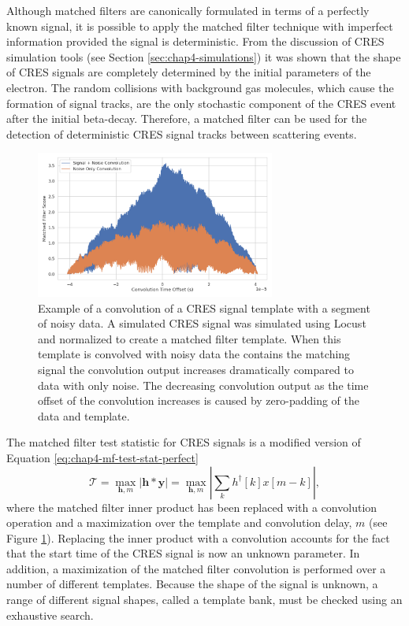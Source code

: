Although matched filters are canonically formulated in terms of a perfectly known signal, it is possible to apply the matched filter technique with imperfect information provided the signal is deterministic. From the discussion of CRES simulation tools (see Section \ref{sec:chap4-simulations}) it was shown that the shape of CRES signals are completely determined by the initial parameters of the electron. The random collisions with background gas molecules, which cause the formation of signal tracks, are the only stochastic component of the CRES event after the initial beta-decay. Therefore, a matched filter can be used for the detection of deterministic CRES signal tracks between scattering events.

\begin{figure}[htbp]
    \centering
    \includegraphics*[width=0.7\textwidth]{figs/Chapter-4/220318_example_convolution.png}
    \caption{Example of a convolution of a CRES signal template with a segment of noisy data. A simulated CRES signal was simulated using Locust and normalized to create a matched filter template. When this template is convolved with noisy data the contains the matching signal the convolution output increases dramatically compared to data with only noise. The decreasing convolution output as the time offset of the convolution increases is caused by zero-padding of the data and template. }
    \label{fig:chap4-mf-convolution-example}
\end{figure}

The matched filter test statistic for CRES signals is a modified version of Equation \ref{eq:chap4-mf-test-stat-perfect}
\begin{equation}
    \mathcal{T} = \max_{\bm{h},m}\left|\bm{h}\ast\bm{y}\right|=\max_{\bm{h},m}\left|\sum_{k}h^\dagger[k]x[m-k]\right|,
    \label{eq:chap4-mf-test-stat-conv}
\end{equation}
where the matched filter inner product has been replaced with a convolution operation and a maximization over the template and convolution delay, $m$ (see Figure \ref{fig:chap4-mf-convolution-example}). Replacing the inner product with a convolution accounts for the fact that the start time of the CRES signal is now an unknown parameter. In addition, a maximization of the matched filter convolution is performed over a number of different templates. Because the shape of the signal is unknown, a range of different signal shapes, called a template bank, must be checked using an exhaustive search.

